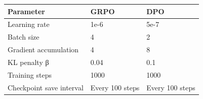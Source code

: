 \begin{table}[htbp]
\centering
\begin{tabular}{lll}
\toprule
Parameter & GRPO & DPO \\
\midrule
Learning rate & 1e-6 & 5e-7 \\
Batch size & 4 & 2 \\
Gradient accumulation & 4 & 8 \\
KL penalty β & 0.04 & 0.1 \\
Training steps & 1000 & 1000 \\
Checkpoint save interval & Every 100 steps & Every 100 steps \\
\bottomrule
\end{tabular}
\end{table}
